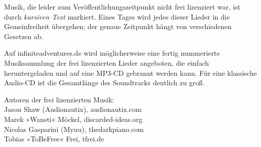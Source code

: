 Musik, die leider zum Veröffentlichungszeitpunkt nicht frei lizenziert war, ist durch \textit{kursiven Text} markiert. Eines Tages wird jedes dieser Lieder in die Gemeinfreiheit übergehen; der genaue Zeitpunkt hängt von verschiedenen Gesetzen ab.

Auf infiniteadventures.de wird möglicherweise eine fertig nummerierte Musiksammlung der frei lizenzierten Lieder angeboten, die einfach heruntergeladen und auf eine MP3-CD gebrannt werden kann. Für eine klassische Audio-CD ist die Gesamtlänge des Soundtracks deutlich zu groß.

Autoren der frei lizenzierten Musik:\\
Jason Shaw (Audionautix), audionautix.com\\
Marek »Wansti« Möckel, discarded-ideas.org\\
Nicolas Gasparini (Myuu), thedarkpiano.com\\ %
Tobias »ToBeFree« Frei, tfrei.de

